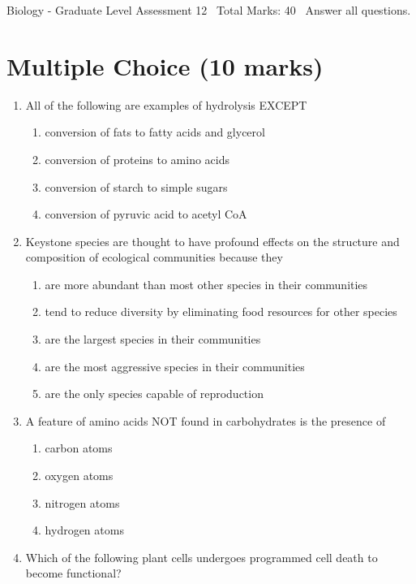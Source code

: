 \documentclass[12pt]{article}
\begin{document}
\begin{center}
Biology - Graduate Level Assessment 12 \
Total Marks: 40 \
Answer all questions.
\end{center}

\section*{Multiple Choice (10 marks)}
\begin{enumerate}[label=\arabic*.]
\item All of the following are examples of hydrolysis EXCEPT
\begin{enumerate}[label=(\alph*)]
    \item conversion of fats to fatty acids and glycerol
    \item conversion of proteins to amino acids
    \item conversion of starch to simple sugars
    \item conversion of pyruvic acid to acetyl CoA
\end{enumerate}
\item Keystone species are thought to have profound effects on the structure and composition of ecological communities because they
\begin{enumerate}[label=(\alph*)]
    \item are more abundant than most other species in their communities
    \item tend to reduce diversity by eliminating food resources for other species
    \item are the largest species in their communities
    \item are the most aggressive species in their communities
    \item are the only species capable of reproduction
\end{enumerate}
\item A feature of amino acids NOT found in carbohydrates is the presence of
\begin{enumerate}[label=(\alph*)]
    \item carbon atoms
    \item oxygen atoms
    \item nitrogen atoms
    \item hydrogen atoms
\end{enumerate}
\item Which of the following plant cells undergoes programmed cell death to become functional?
\begin{enumerate}[label=(\alph*)]

\end{enumerate}
\end{enumerate}
\end{document}
